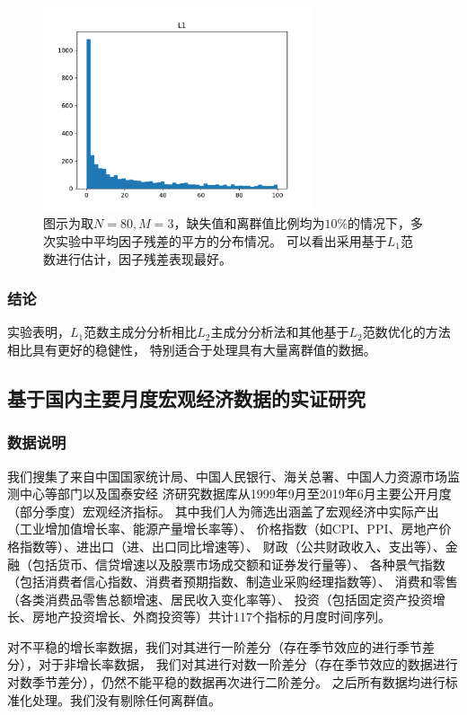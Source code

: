 \begin{figure}[H]
\begin{minipage}[t]{0.48\textwidth}
    \includegraphics[width=8cm]{pics/lab1/l1-ab.pdf}
    \end{minipage}
    \caption{\small 图示为取$N = 80, M=3$，缺失值和离群值比例均为$10\%$的情况下，多次实验中平均因子残差的平方的分布情况。
    可以看出采用基于$L_1$范数进行估计，因子残差表现最好。}
\end{figure}

\subsubsection{结论}
实验表明，$L_1$范数主成分分析相比$L_2$主成分分析法和其他基于$L_2$范数优化的方法相比具有更好的稳健性，
特别适合于处理具有大量离群值的数据。

\subsection{基于国内主要月度宏观经济数据的实证研究}

\subsubsection{数据说明}
我们搜集了来自中国国家统计局、中国人民银行、海关总署、中国人力资源市场监测中心等部门以及国泰安经
济研究数据库从1999年9月至2019年6月主要公开月度（部分季度）宏观经济指标。
其中我们人为筛选出涵盖了宏观经济中实际产出（工业增加值增长率、能源产量增长率等）、
价格指数（如CPI、PPI、房地产价格指数等）、进出口（进、出口同比增速等）、
财政（公共财政收入、支出等）、金融（包括货币、信贷增速以及股票市场成交额和证券发行量等）、
各种景气指数（包括消费者信心指数、消费者预期指数、制造业采购经理指数等）、
消费和零售（各类消费品零售总额增速、居民收入变化率等）、
投资（包括固定资产投资增长、房地产投资增长、外商投资等）共计117个指标的月度时间序列。

对不平稳的增长率数据，我们对其进行一阶差分（存在季节效应的进行季节差分），对于非增长率数据，
我们对其进行对数一阶差分（存在季节效应的数据进行对数季节差分），仍然不能平稳的数据再次进行二阶差分。
之后所有数据均进行标准化处理。我们没有剔除任何离群值。

